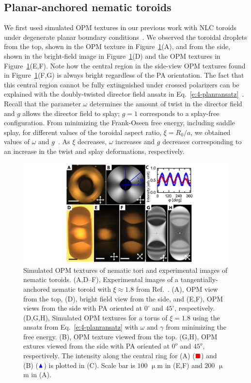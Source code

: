 \subsection{Planar-anchored nematic toroids}
We first used simulated OPM textures in our previous work with NLC toroids under degenerate planar boundary conditions~\cite{RN24}.
We observed the toroidal droplets from the top, shown in the OPM texture in Figure~\ref{f:4-PlanarTorusComparison}(A), and from the side, shown in the bright-field image in Figure~\ref{f:4-PlanarTorusComparison}(D) and the OPM textures in Figure~\ref{f:4-PlanarTorusComparison}(E,F).
Note how the central region in the side-view OPM textures found in Figure~\ref{f:4-PlanarTorusComparison}(F,G) is always bright regardless of the PA orientation.
The fact that this central region cannot be fully extinguished under crossed polarizers can be explained with the doubly-twisted director field ansatz in Eq.~\ref{e:4-planransatz}~\cite{RN24}.
Recall that the parameter $\omega$ determines the amount of twist in the director field and $g$ allows the director field to splay; $g=1$ corresponds to a splay-free configuration.
From minimizing the Frank-Oseen free energy, including saddle splay, for different values of the toroidal aspect ratio, $\xi = R_0/a$, we obtained values of $\omega$ and $g$~\cite{RN24}.
As $\xi$ decreases, $\omega$ increases and $g$ decreases corresponding to an increase in the twist and splay deformations, respectively.
\begin{figure}
\centering
\includegraphics{figures/C4/Ch4-Figs_PlanarToroids.png}
\caption{Simulated OPM textures of nematic tori and experimental images of nematic toroids. (A,D--F), Experimental images of a tangentially-anchored nematic toroid with $\xi \approx 1.8$ from Ref.~\cite{RN24}.
(A), OPM view from the top, (D), bright field view from the side, and (E,F), OPM views from the side with PA oriented at $0^{\circ}$ and $45^{\circ}$, respectively.
(D,G,H), Simulated OPM textures for a torus of $\xi = 1.8$ using the ansatz from Eq.~\ref{e:4-planransatz} with $\omega$ and $\gamma$ from minimizing the free energy.
(B), OPM texture viewed from the top.
(G,H), OPM extures viewed from the side with PA oriented at $0^o$ and $45^o$, respectively.
The intensity along the central ring for (A) ($\color{red}\blacksquare$) and (B) ($\color{blue}\blacktriangle$) is plotted in (C).
Scale bar is $100$ $\upmu$m in (E,F) and $200$ $\upmu$m in (A).}\label{f:4-PlanarTorusComparison}
\end{figure}

